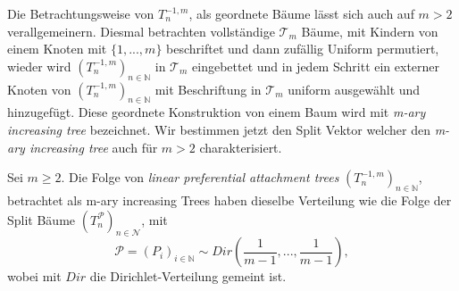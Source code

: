 Die Betrachtungsweise von $T_n^{-1,m}$, als geordnete Bäume lässt sich auch auf $m > 2$ verallgemeinern. Diesmal betrachten vollständige $\mathcal{T}_m$ Bäume, mit Kindern von einem Knoten mit $\{1,...,m\}$ beschriftet und dann zufällig Uniform permutiert, wieder wird $(T_n^{-1,m})_{n \in \mathbb{N}}$ in $\mathcal{T}_m$ eingebettet und in jedem Schritt ein externer Knoten von $(T_n^{-1,m})_{n \in \mathbb{N}}$ mit Beschriftung in $\mathcal{T}_m$ uniform ausgewählt und hinzugefügt. Diese geordnete Konstruktion von einem Baum wird mit \textit{m-ary increasing tree} bezeichnet. Wir bestimmen jetzt den Split Vektor welcher den \textit{m-ary increasing tree} auch für $m >2$ charakterisiert.
\begin{theorem}
    \label{Satz mary increasing trees}
    Sei $m \geq 2$. Die Folge von \textit{linear preferential attachment trees} $(T_n^{-1,m})_{n \in \mathbb{N}}$, betrachtet als m-ary increasing Trees haben dieselbe Verteilung wie die Folge der Split Bäume $(T^\mathcal{P}_n)_{n \in \mathcal{N}}$, mit 
    \[
    \mathcal{P} = (P_i)_{i \in \mathbb{N}} \sim Dir(\frac{1}{m-1},...,\frac{1}{m-1}),
    \]
    wobei mit $Dir$ die Dirichlet-Verteilung gemeint ist.
\end{theorem}

